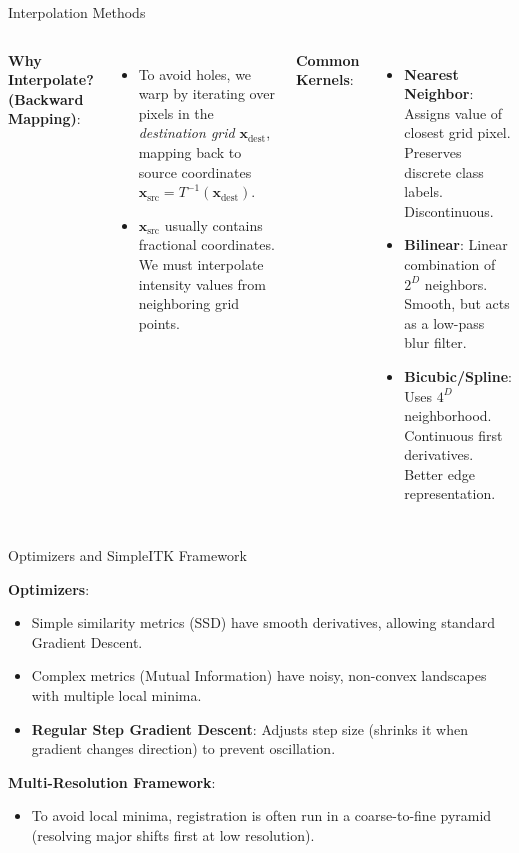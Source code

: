 \documentclass[aspectratio=169,10pt]{beamer}
\begin{document}
\begin{frame}{Interpolation Methods}
\begin{columns}[T,onlytextwidth]
\small
\textbf{Why Interpolate? (Backward Mapping)}:
\begin{itemize}
    \item To avoid holes, we warp by iterating over pixels in the \textit{destination grid} $\mathbf{x}_{\text{dest}}$, mapping back to source coordinates $\mathbf{x}_{\text{src}} = T^{-1}(\mathbf{x}_{\text{dest}})$.
    \item $\mathbf{x}_{\text{src}}$ usually contains fractional coordinates. We must interpolate intensity values from neighboring grid points.
\end{itemize}
\textbf{Common Kernels}:
\begin{itemize}
    \item \textbf{Nearest Neighbor}: Assigns value of closest grid pixel. Preserves discrete class labels. Discontinuous.
    \item \textbf{Bilinear}: Linear combination of $2^D$ neighbors. Smooth, but acts as a low-pass blur filter.
    \item \textbf{Bicubic/Spline}: Uses $4^D$ neighborhood. Continuous first derivatives. Better edge representation.
\end{itemize}
\centering
{}
\end{columns}
\end{frame}

\begin{frame}{Optimizers and SimpleITK Framework}


\textbf{Optimizers}:
\begin{itemize}
    \item Simple similarity metrics (SSD) have smooth derivatives, allowing standard Gradient Descent.
    \item Complex metrics (Mutual Information) have noisy, non-convex landscapes with multiple local minima.
    \item \textbf{Regular Step Gradient Descent}: Adjusts step size (shrinks it when gradient changes direction) to prevent oscillation.
\end{itemize}
\textbf{Multi-Resolution Framework}:
\begin{itemize}
    \item To avoid local minima, registration is often run in a coarse-to-fine pyramid (resolving major shifts first at low resolution).
\end{itemize}

\end{frame}
\end{document}
